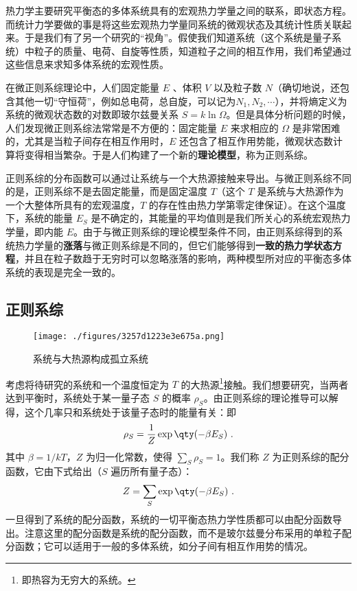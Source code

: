 热力学主要研究平衡态的多体系统具有的宏观热力学量之间的联系，即状态方程。而统计力学要做的事是将这些宏观热力学量同系统的微观状态及其统计性质关联起来。于是我们有了另一个研究的“视角”。假使我们知道系统（这个系统是量子系统）中粒子的质量、电荷、自旋等性质，知道粒子之间的相互作用，我们希望通过这些信息来求知多体系统的宏观性质。

在微正则系综理论中，人们固定能量 $E$ 、体积 $V$ 以及粒子数 $N$（确切地说，还包含其他一切“守恒荷”，例如总电荷，总自旋，可以记为$N_1,N_2,\cdots$），并将熵定义为系统的微观状态数的对数即玻尔兹曼关系 $S=k\ln \Omega$。但是具体分析问题的时候，人们发现微正则系综法常常是不方便的：固定能量 $E$ 来求相应的 $\Omega$ 是非常困难的，尤其是当粒子间存在相互作用时，$E$ 还包含了相互作用势能，微观状态数计算将变得相当繁杂。于是人们构建了一个新的\textbf{理论模型}，称为正则系综。

正则系综的分布函数可以通过让系统与一个大热源接触来导出。与微正则系综不同的是，正则系综不是去固定能量，而是固定温度 $T$（这个 $T$ 是系统与大热源作为一个大整体所具有的宏观温度，$T$ 的存在性由热力学第零定律保证）。在这个温度下，系统的能量 $E_S$ 是不确定的，其能量的平均值则是我们所关心的系统宏观热力学量，即内能 $E$。由于与微正则系综的理论模型条件不同，由正则系综得到的系统热力学量的\textbf{涨落}与微正则系综是不同的，但它们能够得到\textbf{一致的热力学状态方程}，并且在粒子数趋于无穷时可以忽略涨落的影响，两种模型所对应的平衡态多体系统的表现是完全一致的。
\subsection{正则系综}
\begin{figure}[ht]
\centering
\texttt{[image: ./figures/3257d1223e3e675a.png]}
\caption{系统与大热源构成孤立系统} \label{fig_CEsb1}
\end{figure}

考虑将待研究的系统和一个温度恒定为 $T$ 的大热源\footnote{即热容为无穷大的系统。}接触。我们想要研究，当两者达到平衡时，系统处于某一量子态 $S$ 的概率 $\rho_S$。由正则系综的理论推导可以解得，这个几率只和系统处于该量子态时的能量有关：即
\begin{equation}\label{eq_CEsb_1}
\rho_S=\frac{1}{Z}\exp\qty(-\beta E_S)~.
\end{equation}
其中 $\beta=1/kT$，$Z$ 为归一化常数，使得 $\sum_S \rho_S=1$。我们称 $Z$ 为正则系综的配分函数，它由下式给出（$S$ 遍历所有量子态）：
\begin{equation}
Z=\sum_S \exp\qty(-\beta E_S)~.
\end{equation}
一旦得到了系统的配分函数，系统的一切平衡态热力学性质都可以由配分函数导出。注意这里的配分函数是系统的配分函数，而不是玻尔兹曼分布采用的单粒子配分函数；它可以适用于一般的多体系统，如分子间有相互作用势的情况。

